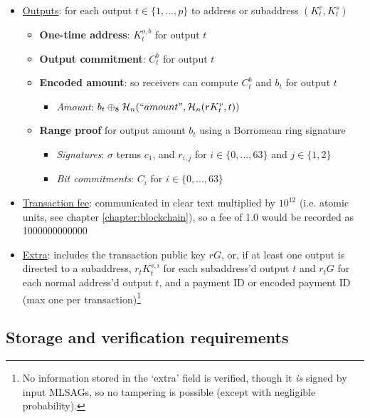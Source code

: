 \begin{itemize}
    \item \underline{Outputs}: for each output $t \in \{1,...,p\}$ to address or subaddress $(K^v_t,K^s_t)$
    \begin{itemize}
        \item \textbf{One-time address}: $K^{o,b}_t$ for output $t$
        \item \textbf{Output commitment}: $C^{b}_t$ for output $t$
        \item \textbf{Encoded amount}: so receivers can compute $C^{b}_t$ and $b_t$ for output $t$
        \begin{itemize}
            \item \textit{Amount}: $b_t \oplus_8 \mathcal{H}_n(``amount",\mathcal{H}_n(r K^v_t,t))$
        \end{itemize}
        \item \textbf{Range proof} for output amount $b_t$ using a Borromean ring signature
        \begin{itemize}
            \item \textit{Signatures}: $\sigma$ terms $c_1$, and $r_{i,j}$ for $i \in \{0,...,63\}$ and $j \in \{1,2\}$
            \item \textit{Bit commitments}: $C_i$ for $i \in \{0,...,63\}$
        \end{itemize}
    \end{itemize}
    \item \underline{Transaction fee}: communicated in clear text multiplied by $10^{12}$ (i.e. atomic units, see chapter \ref{chapter:blockchain}), so a fee of 1.0 would be recorded as 1000000000000
    \item \underline{Extra}: includes the transaction public key $r G$, or, if at least one output is directed to a subaddress, $r_t K^{s,i}_t$ for each subaddress'd output $t$ and $r_t G$ for each normal address'd output $t$, and a payment ID or encoded payment ID (max one per transaction)\footnote{No information stored in the `extra' field is verified, though it {\em is} signed by input MLSAGs, so no tampering is possible (except with negligible probability).}
\end{itemize}

\newpage
\subsection{Storage and verification requirements}

